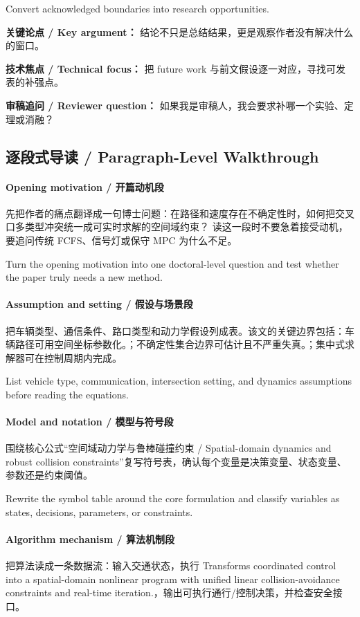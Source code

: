 \documentclass[UTF8,a4paper,11pt,fontset=fandol]{ctexart}
\begin{document}
Convert acknowledged boundaries into research opportunities.

\textbf{关键论点 / Key argument：} 结论不只是总结结果，更是观察作者没有解决什么的窗口。

\textbf{技术焦点 / Technical focus：} 把 future work 与前文假设逐一对应，寻找可发表的补强点。

\textbf{审稿追问 / Reviewer question：} 如果我是审稿人，我会要求补哪一个实验、定理或消融？


\subsection{逐段式导读 / Paragraph-Level Walkthrough}
\paragraph{Opening motivation / 开篇动机段}先把作者的痛点翻译成一句博士问题：在路径和速度存在不确定性时，如何把交叉口多类型冲突统一成可实时求解的空间域约束？ 读这一段时不要急着接受动机，要追问传统 FCFS、信号灯或保守 MPC 为什么不足。

Turn the opening motivation into one doctoral-level question and test whether the paper truly needs a new method.

\paragraph{Assumption and setting / 假设与场景段}把车辆类型、通信条件、路口类型和动力学假设列成表。该文的关键边界包括：车辆路径可用空间坐标参数化。；不确定性集合边界可估计且不严重失真。；集中式求解器可在控制周期内完成。

List vehicle type, communication, intersection setting, and dynamics assumptions before reading the equations.

\paragraph{Model and notation / 模型与符号段}围绕核心公式“空间域动力学与鲁棒碰撞约束 / Spatial-domain dynamics and robust collision constraints”复写符号表，确认每个变量是决策变量、状态变量、参数还是约束阈值。

Rewrite the symbol table around the core formulation and classify variables as states, decisions, parameters, or constraints.

\paragraph{Algorithm mechanism / 算法机制段}把算法读成一条数据流：输入交通状态，执行 Transforms coordinated control into a spatial-domain nonlinear program with unified linear collision-avoidance constraints and real-time iteration.，输出可执行通行/控制决策，并检查安全接口。
\end{document}
